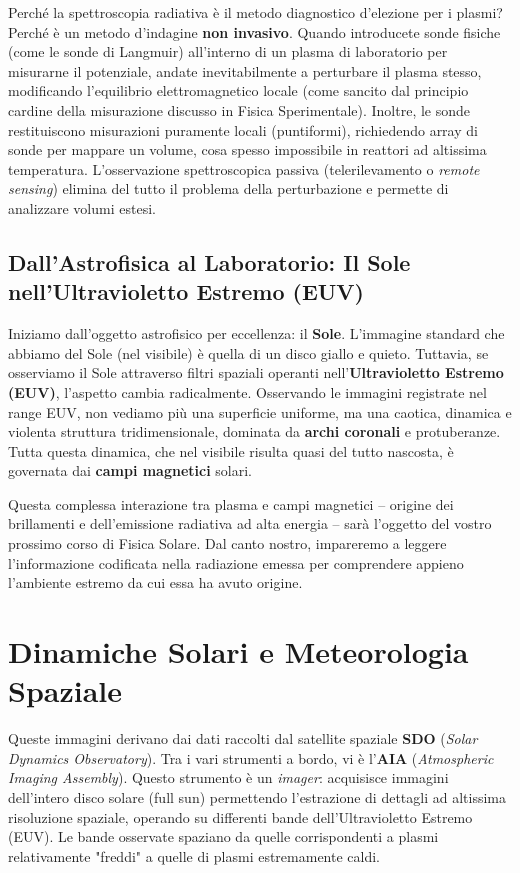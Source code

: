     Perché la spettroscopia radiativa è il metodo diagnostico d'elezione per i plasmi?
    Perché è un metodo d'indagine \textbf{non invasivo}.
    Quando introducete sonde fisiche (come le sonde di Langmuir) all'interno di un plasma di laboratorio per misurarne il potenziale, andate inevitabilmente a perturbare il plasma stesso, modificando l'equilibrio elettromagnetico locale (come sancito dal principio cardine della misurazione discusso in Fisica Sperimentale). Inoltre, le sonde restituiscono misurazioni puramente locali (puntiformi), richiedendo array di sonde per mappare un volume, cosa spesso impossibile in reattori ad altissima temperatura.
    L'osservazione spettroscopica passiva (telerilevamento o \textit{remote sensing}) elimina del tutto il problema della perturbazione e permette di analizzare volumi estesi.
    
    \subsection{Dall'Astrofisica al Laboratorio: Il Sole nell'Ultravioletto Estremo (EUV)}
    
    Iniziamo dall'oggetto astrofisico per eccellenza: il \textbf{Sole}.
    L'immagine standard che abbiamo del Sole (nel visibile) è quella di un disco giallo e quieto. Tuttavia, se osserviamo il Sole attraverso filtri spaziali operanti nell'\textbf{Ultravioletto Estremo (EUV)}, l'aspetto cambia radicalmente.
    Osservando le immagini registrate nel range EUV, non vediamo più una superficie uniforme, ma una caotica, dinamica e violenta struttura tridimensionale, dominata da \textbf{archi coronali} e protuberanze.
    Tutta questa dinamica, che nel visibile risulta quasi del tutto nascosta, è governata dai \textbf{campi magnetici} solari.
    
    Questa complessa interazione tra plasma e campi magnetici – origine dei brillamenti e dell'emissione radiativa ad alta energia – sarà l'oggetto del vostro prossimo corso di Fisica Solare. Dal canto nostro, impareremo a leggere l'informazione codificata nella radiazione emessa per comprendere appieno l'ambiente estremo da cui essa ha avuto origine.
    
\section{Dinamiche Solari e Meteorologia Spaziale}

Queste immagini derivano dai dati raccolti dal satellite spaziale \textbf{SDO} (\textit{Solar Dynamics Observatory}). Tra i vari strumenti a bordo, vi è l'\textbf{AIA} (\textit{Atmospheric Imaging Assembly}). Questo strumento è un \textit{imager}: acquisisce immagini dell'intero disco solare (full sun) permettendo l'estrazione di dettagli ad altissima risoluzione spaziale, operando su differenti bande dell'Ultravioletto Estremo (EUV). Le bande osservate spaziano da quelle corrispondenti a plasmi relativamente "freddi" a quelle di plasmi estremamente caldi.

